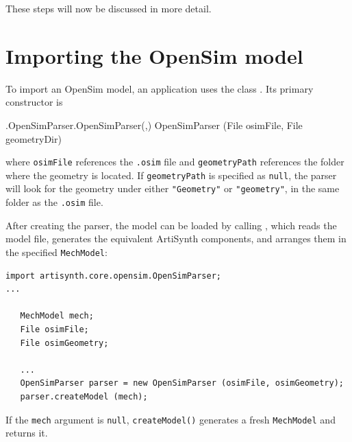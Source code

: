 These steps will now be discussed in more detail.

\section{Importing the OpenSim model}
\label{OpenSimParser} 

To import an OpenSim model, an application uses the class
. Its primary constructor is
%
\begin{methodtable}{0.5}{0.5}
%
\methodentry
{\osim.OpenSimParser.OpenSimParser(,)}%
{OpenSimParser (File osimFile, File geometryDir)}%
{\ }%
%
\end{methodtable}
%
where {\tt osimFile} references the {\tt .osim} file and {\tt geometryPath}
references the folder where the geometry is located. If {\tt geometryPath} is
specified as {\tt null}, the parser will look for the geometry under either
{\tt "Geometry"} or {\tt "geometry"}, in the same folder as the {\tt .osim}
file.

After creating the parser, the model can be loaded by calling
,
which reads the model file, generates the equivalent ArtiSynth components,
and arranges them in the specified {\tt MechModel}:
%
\begin{lstlisting}[]
import artisynth.core.opensim.OpenSimParser;
...

   MechModel mech;
   File osimFile;
   File osimGeometry;

   ...
   OpenSimParser parser = new OpenSimParser (osimFile, osimGeometry);
   parser.createModel (mech);
\end{lstlisting}
%
If the {\tt mech} argument is {\tt null}, {\tt createModel()} generates a fresh
{\tt MechModel} and returns it.

